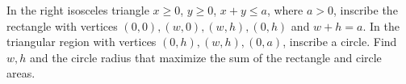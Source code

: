 In the right isosceles triangle $x\ge0$, $y\ge0$, $x+y\le a$, where $a>0$, inscribe the rectangle with vertices $(0,0),(w,0),(w,h),(0,h)$ and $w+h=a$. In the triangular region with vertices $(0,h),(w,h),(0,a)$, inscribe a circle. Find $w,h$ and the circle radius that maximize the sum of the rectangle and circle areas.
